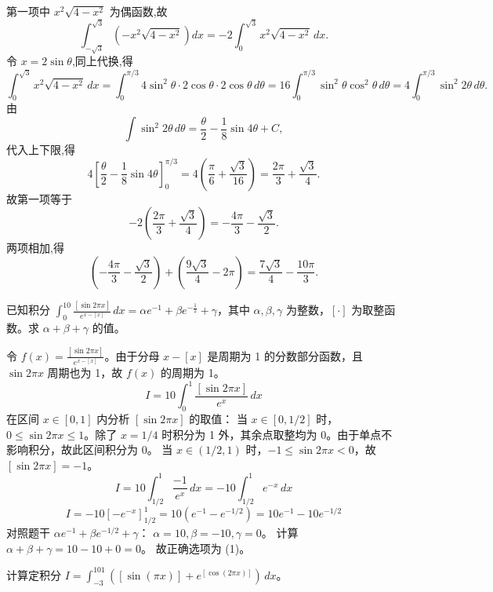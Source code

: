 \begin{questions}
\begin{parts}
\begin{solution}
第一项中 $x^2\sqrt{4-x^2}$ 为偶函数,故
\[
\int_{-\sqrt{3}}^{\sqrt{3}} \left(-x^2\sqrt{4-x^2}\right)dx = -2\int_0^{\sqrt{3}} x^2\sqrt{4-x^2}\,dx.
\]
令 $x=2\sin\theta$,同上代换,得
\[
\int_0^{\sqrt{3}} x^2\sqrt{4-x^2}\,dx = \int_0^{\pi/3} 4\sin^2\theta\cdot 2\cos\theta\cdot 2\cos\theta\,d\theta = 16\int_0^{\pi/3}\sin^2\theta\cos^2\theta\,d\theta = 4\int_0^{\pi/3}\sin^2 2\theta\,d\theta.
\]
由
\[
\int \sin^2 2\theta\,d\theta = \frac{\theta}{2}-\frac{1}{8}\sin 4\theta+C,
\]
代入上下限,得
\[
4\left[\frac{\theta}{2}-\frac{1}{8}\sin 4\theta\right]_0^{\pi/3} = 4\left(\frac{\pi}{6}+\frac{\sqrt{3}}{16}\right) = \frac{2\pi}{3}+\frac{\sqrt{3}}{4}.
\]
故第一项等于
\[
-2\left(\frac{2\pi}{3}+\frac{\sqrt{3}}{4}\right) = -\frac{4\pi}{3}-\frac{\sqrt{3}}{2}.
\]
两项相加,得
\[
\left(-\frac{4\pi}{3}-\frac{\sqrt{3}}{2}\right)+\left(\frac{9\sqrt{3}}{4}-2\pi\right) = \frac{7\sqrt{3}}{4}-\frac{10\pi}{3}.
\]
\end{solution}

\end{parts}
\question
已知积分 $\int_{0}^{10} \frac{[\sin 2\pi x]}{e^{x - [x]}} \, dx = \alpha e^{-1} + \beta e^{-\frac{1}{2}} + \gamma$，其中 $\alpha, \beta, \gamma$ 为整数，$[\cdot]$ 为取整函数。求 $\alpha + \beta + \gamma$ 的值。

\begin{solution}
令 $f(x) = \frac{[\sin 2\pi x]}{e^{x - [x]}}$。由于分母 $x - [x]$ 是周期为 1 的分数部分函数，且 $\sin 2\pi x$ 周期也为 1，故 $f(x)$ 的周期为 1。
\[
I = 10 \int_{0}^{1} \frac{[\sin 2\pi x]}{e^x} \, dx
\]
在区间 $x \in [0, 1]$ 内分析 $[\sin 2\pi x]$ 的取值：
当 $x \in [0, 1/2]$ 时，$0 \le \sin 2\pi x \le 1$。除了 $x = 1/4$ 时积分为 1 外，其余点取整均为 0。由于单点不影响积分，故此区间积分为 0。
当 $x \in (1/2, 1)$ 时，$-1 \le \sin 2\pi x < 0$，故 $[\sin 2\pi x] = -1$。
\[
I = 10 \int_{1/2}^{1} \frac{-1}{e^x} \, dx = -10 \int_{1/2}^{1} e^{-x} \, dx
\]
\[
I = -10 [ -e^{-x} ]_{1/2}^{1} = 10 (e^{-1} - e^{-1/2}) = 10e^{-1} - 10e^{-1/2}
\]
对照题干 $\alpha e^{-1} + \beta e^{-1/2} + \gamma$：
$\alpha = 10, \beta = -10, \gamma = 0$。
计算 $\alpha + \beta + \gamma = 10 - 10 + 0 = 0$。
故正确选项为 (1)。
\end{solution}
\question
计算定积分 $I = \int_{-3}^{101} ([\sin(\pi x)] + e^{[\cos(2\pi x)]}) \, dx$。


\end{questions}
